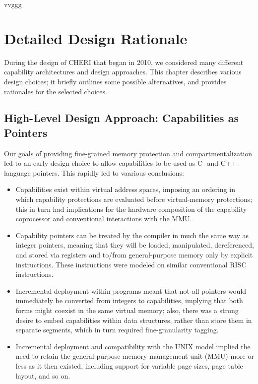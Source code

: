 vvggg\chapter{Detailed Design Rationale}
\label{chap:rationale}

During the design of CHERI that began in 2010, we considered many
different capability architectures and design approaches. This chapter
describes various design choices; it briefly outlines some
possible alternatives, and provides rationales for the selected
choices.

\section{High-Level Design Approach: Capabilities as Pointers}

Our goals of providing fine-grained memory protection and compartmentalization
led to an early design choice to allow capabilities to be used as C- and
C++-language pointers.
This rapidly led to vaarious conclusions:

\begin{itemize}
\item Capabilities exist within virtual address spaces, imposing an ordering in
  which capability protections are evaluated before virtual-memory
  protections; this in turn had implications for the hardware composition of
  the capability coprocessor and conventional interactions with the MMU.

\item Capability pointers can be treated by the compiler in much the same way
  as integer pointers, meaning that they will be loaded, manipulated,
  dereferenced, and stored via registers and to/from general-purpose memory
  only by explicit instructions.
  These instructions were modeled on similar conventional RISC instructions.

\item Incremental deployment within programs meant that not all pointers would
  immediately be converted from integers to capabilities, implying that both
  forms might coexist in the same virtual memory;
  also, there was a strong desire to embed capabilities
  within data structures, rather than store them in separate segments,
  which in turn required fine-granularity tagging.

\item Incremental deployment and compatibility with the UNIX model implied
  the need to retain
  the general-purpose memory management unit (MMU) more or less as
  it then existed, including support for variable page sizes, page table layout,
  and so on.
\end{itemize}

